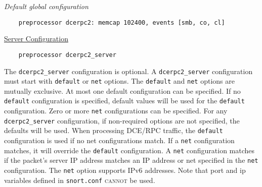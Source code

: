 \documentclass[english]{report}
\begin{document}
\textit{Default global configuration}
\footnotesize
\begin{verbatim}
    preprocessor dcerpc2: memcap 102400, events [smb, co, cl]
\end{verbatim}
\normalsize

\underline{Server Configuration}

\begin{verbatim}
    preprocessor dcerpc2_server
\end{verbatim}

The \texttt{dcerpc2\_server} configuration is optional.  A
\texttt{dcerpc2\_server} configuration must start with \texttt{default} or
\texttt{net} options.  The \texttt{default} and \texttt{net} options are
mutually exclusive.  At most one default configuration can be specified. If no
\texttt{default} configuration is specified, default values will be used for
the \texttt{default} configuration.  Zero or more \texttt{net} configurations
can be specified.  For any \texttt{dcerpc2\_server} configuration, if
non-required options are not specified, the defaults will be used.  When
processing DCE/RPC traffic, the \texttt{default} configuration is used if no
net configurations match.  If a \texttt{net} configuration matches, it will
override the \texttt{default} configuration. A \texttt{net} configuration
matches if the packet's server IP address matches an IP address or net
specified in the \texttt{net} configuration.  The \texttt{net} option supports
IPv6 addresses.  Note that port and ip variables defined in \texttt{snort.conf}
\textsc{cannot} be used.
\end{document}
